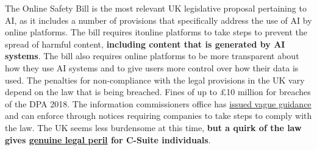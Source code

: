 The Online Safety Bill is the most relevant UK legislative proposal pertaining to AI, as it includes a number of provisions that specifically address the use of AI by online platforms. The bill requires it{online} platforms to take steps to prevent the spread of harmful content, \textbf{including content that is generated by AI systems}. The bill also requires online platforms to be more transparent about how they use AI systems and to give users more control over how their data is used. The penalties for non-compliance with the legal provisions in the UK vary depend on the law that is being breached. Fines of up to £10 million for breaches of the DPA 2018. The information commissioners office has \href{https://ico.org.uk/for-organisations/uk-gdpr-guidance-and-resources/artificial-intelligence/guidance-on-ai-and-data-protection/how-should-we-assess-security-and-data-minimisation-in-ai/}{issued vague guidance} and can enforce through notices requiring companies to take steps to comply with the law. The UK seems less burdensome at this time, \textbf{but a quirk of the law gives \href{https://webdevlaw.uk/2022/11/21/a-quick-hypothetical-situation-or-your-crash-introduction-to-the-real-world/}{genuine legal peril} for C-Suite individuals}. 